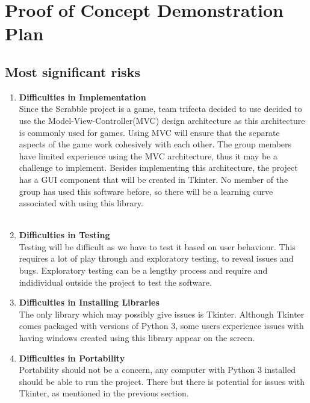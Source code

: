 \documentclass{article}
\begin{document}
\section{Proof of Concept Demonstration Plan}
\subsection{Most significant risks}
\begin{enumerate}
\item \textbf{Difficulties in Implementation}\\
Since the Scrabble project is a game, team trifecta decided to use decided to use the Model-View-Controller(MVC) design architecture as this architecture is commonly used for games. Using MVC will ensure that the separate aspects of the game work cohesively with each other. The group members have limited experience using the MVC architecture, thus it may be a challenge to implement. Besides implementing this architecture, the project has a GUI component that will be created in Tkinter. No member of the group has used this software before, so there will be a learning curve associated with using this library. \\ \\

\item \textbf{Difficulties in Testing}\\
Testing will be difficult as we have to test it based on user behaviour. This requires a lot of play through and exploratory testing, to reveal issues and bugs. Exploratory testing can be a lengthy process and require and indidividual outside the project to test the software.

\item \textbf{Difficulties in Installing Libraries}\\
The only library which may possibly give issues is Tkinter. Although Tkinter comes packaged with versions of Python 3, some users experience issues with having windows created using this library appear on the screen.

\item \textbf{Difficulties in Portability}\\
Portability should not be a concern, any computer with Python 3 installed should be able to run the project. There but there is potential for issues with Tkinter, as mentioned in the previous section. 
\end{enumerate}
\end{document}
